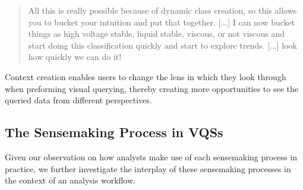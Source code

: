 \begin{quote}
All this is really possible because of dynamic class creation, so this allows you to bucket your intuition and put that together. [...] I can now bucket things as high voltage stable, liquid stable, viscous, or not viscous and start doing this classification quickly and start to explore trends. [...] look how quickly we can do it!%
\end{quote}
Context creation enables users to change the lens in which they look through when preforming visual querying, thereby creating more opportunities to see the queried data from different perspectives.
\subsection{The Sensemaking Process in VQSs}
Given our observation on how analysts make use of each sensemaking process in practice, we further investigate the interplay of these sensemaking processes in the context of an analysis workflow. %

